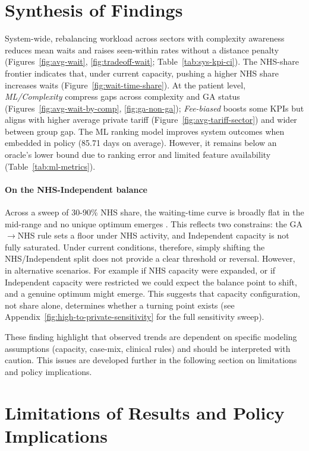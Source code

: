 \documentclass[ %
                    author={Nattanan Nawakitbamrung},
                supervisor={Dr. Sébastien Rochat},
                    degree={MSc},
                     title={Developing and Evaluating the Impact of a Single Patient Treatment List (PTL) for an NHS Integrated Care System},
                  subtitle={},
                      type={},
                      year={2025}]{dissertation}
\begin{document}
\section{Synthesis of Findings}
System-wide, rebalancing workload across sectors with complexity awareness reduces mean waits and raises seen-within rates without a distance penalty (Figures~\ref{fig:avg-wait}, \ref{fig:tradeoff-wait}; Table~\ref{tab:sys-kpi-ci}). The NHS-share frontier indicates that, under current capacity, pushing a higher NHS share increases waits (Figure~\ref{fig:wait-time-share}). At the patient level, \textit{ML/Complexity} compress gaps across complexity and GA status (Figures~\ref{fig:avg-wait-by-comp}, \ref{fig:ga-non-ga}); \textit{Fee-biased} boosts some KPIs but aligns with higher average private tariff (Figure~\ref{fig:avg-tariff-sector}) and wider between group gap. The ML ranking model improves system outcomes when embedded in policy (85.71 days on average). However, it remains below an oracle's lower bound due to ranking error and limited feature availability (Table~\ref{tab:ml-metrics}). 

\paragraph{On the NHS-Independent balance}
Across a sweep of 30-90\% NHS share, the waiting-time curve is broadly flat in the mid-range and no unique optimum emerges . This reflects two constrains: the GA$\rightarrow$NHS rule sets a floor under NHS activity, and Independent capacity is not fully saturated. Under current conditions, therefore, simply shifting the NHS/Independent split does not provide a clear threshold or reversal. However, in alternative scenarios. For example if NHS capacity were expanded, or if Independent capacity were restricted we could expect the balance point to shift, and a genuine optimum might emerge. This suggests that capacity configuration, not share alone, determines whether a turning point exists (see Appendix~\ref{fig:high-to-private-sensitivity} for the full sensitivity sweep).

These finding highlight that observed trends are dependent on specific modeling assumptions (capacity, case-mix, clinical rules) and should be interpreted with caution. This issues are developed further in the following section on limitations and policy implications.

\section{Limitations of Results and Policy Implications}
\label{sec:limits-imp}
\end{document}
